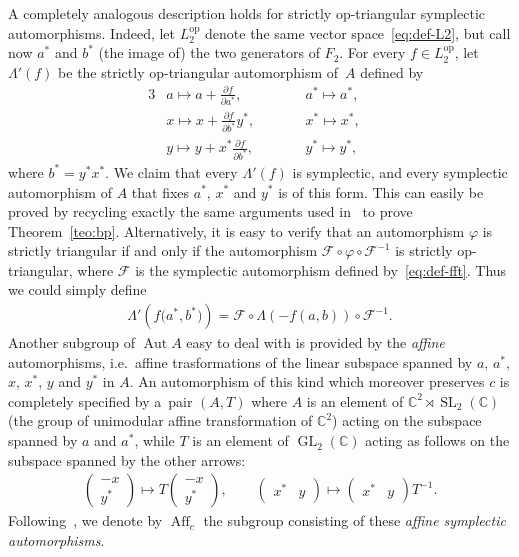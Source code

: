 \documentclass[pdftex]{sigma}
\newcommand{\bb}[1]{\mathbb{#1}}
\DeclareMathOperator{\GL}{GL}
\DeclareMathOperator{\SL}{SL}
\DeclareMathOperator{\Aut}{Aut}
\DeclareMathOperator{\Aff}{Aff}
\begin{document}
A completely analogous description holds for strictly op-triangular symplectic automorphisms.
Indeed, let \(L_{2}^{\mathrm{op}}\) denote the same vector space~\eqref{eq:def-L2}, but call now \(a^{*}\)
and \(b^{*}\) (the image of) the two generators of \(F_{2}\).
For every \(f\in L_{2}^{\mathrm{op}}\), let \(\Lambda'(f)\) be the strictly op-triangular automorphism of~\(A\) def\/ined by
\begin{alignat*}{3}
& a\mapsto a+\frac{\partial f}{\partial a^{*}}, \qquad && a^{*}\mapsto a^{*}, & \\
& x\mapsto x+\frac{\partial f}{\partial b^{*}}y^{*}, \qquad && x^{*}\mapsto x^{*}, & \\
& y\mapsto y+x^{*}\frac{\partial f}{\partial b^{*}}, \qquad && y^{*}\mapsto y^{*}, &
\end{alignat*}
where \(b^{*} = y^{*}x^{*}\).
We claim that every \(\Lambda'(f)\) is symplectic, and every symplectic automorphism of \(A\) that f\/ixes
\(a^{*}\), \(x^{*}\) and \(y^{*}\) is of this form.
This can easily be proved by recycling exactly the same arguments used in~\cite{bp08} to prove
Theorem~\ref{teo:bp}.
Alternatively, it is easy to verify that an automorphism \(\varphi\) is strictly triangular if and only if
the automorphism \(\mathcal{F}\circ \varphi\circ \mathcal{F}^{-1}\) is strictly op-triangular, where
\(\mathcal{F}\) is the symplectic automorphism def\/ined by~\eqref{eq:def-fft}.
Thus we could simply def\/ine
\begin{gather}
\label{eq:t-opt}
\Lambda'(f\big(a^{*},b^{*}\big))=\mathcal{F}\circ\Lambda(-f(a,b))\circ\mathcal{F}^{-1}.
\end{gather}
Another subgroup of \(\Aut A\) easy to deal with is provided by the \emph{affine} automorphisms, i.e.\
af\/f\/ine trasformations of the linear subspace spanned by \(a\), \(a^{*}\), \(x\), \(x^{*}\), \(y\) and
\(y^{*}\) in \(A\).
An automorphism of this kind which moreover preserves \(c\) is completely specif\/ied by a~pair \((A,T)\)
where \(A\) is an element of \(\bb{C}^{2}\rtimes \SL_{2}(\bb{C})\) (the group of unimodular af\/f\/ine
transformation of \(\bb{C}^{2}\)) acting on the subspace spanned by \(a\) and \(a^{*}\), while \(T\) is an
element of \(\GL_{2}(\bb{C})\) acting as follows on the subspace spanned by the other arrows:
\begin{gather*}%
\begin{pmatrix}
-x
\\
y^{*}
\end{pmatrix}
\mapsto T
\begin{pmatrix}
-x
\\
y^{*}
\end{pmatrix},
\qquad
\begin{pmatrix}
x^{*}&y
\end{pmatrix}
\mapsto
\begin{pmatrix}
x^{*}&y
\end{pmatrix}
T^{-1}.
\end{gather*}
Following~\cite{bp08}, we denote by \(\Aff_{c}\) the subgroup consisting of these \emph{affine symplectic
automorphisms}.
\end{document}
